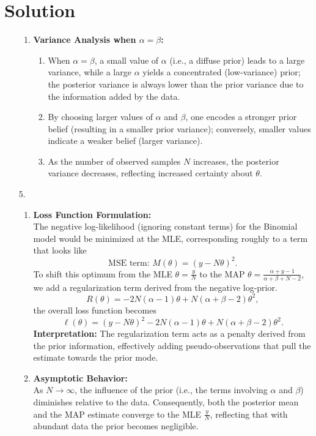 \documentclass[submit]{../harvardml}
\newenvironment{answer}
  {\section*{Solution}}
{}
\begin{document}
\begin{answer}
\begin{enumerate}
\begin{enumerate}
        \item \textbf{Variance Analysis when \(\alpha = \beta\):}\\[1mm]
              \begin{enumerate}
                \item When \(\alpha = \beta\), a small value of \(\alpha\) (i.e., a diffuse prior) leads to a large variance, while a large \(\alpha\) yields a concentrated (low-variance) prior; the posterior variance is always lower than the prior variance due to the information added by the data.
                \item By choosing larger values of \(\alpha\) and \(\beta\), one encodes a stronger prior belief (resulting in a smaller prior variance); conversely, smaller values indicate a weaker belief (larger variance).
                \item As the number of observed samples \(N\) increases, the posterior variance decreases, reflecting increased certainty about \(\theta\).
              \end{enumerate}
      \end{enumerate}

    \item[5.]
      \begin{enumerate}
        \item \textbf{Loss Function Formulation:}\\[1mm]
              The negative log-likelihood (ignoring constant terms) for the Binomial model would be minimized at the MLE, corresponding roughly to a term that looks like
              \[
              \text{MSE term: } M(\theta) = (y-N\theta)^2.
              \]
              To shift this optimum from the MLE \(\theta=\frac{y}{N}\) to the MAP \(\theta=\frac{\alpha+y-1}{\alpha+\beta+N-2}\), we add a regularization term derived from the negative log-prior.
              \[
              R(\theta) = -2N(\alpha-1)\theta + N(\alpha+\beta-2)\theta^2,
              \]
              the overall loss function becomes
              \[
              \ell(\theta) = (y-N\theta)^2 -2N(\alpha-1)\theta + N(\alpha+\beta-2)\theta^2.
              \]
              \textbf{Interpretation:} The regularization term acts as a penalty derived from the prior information, effectively adding pseudo-observations that pull the estimate towards the prior mode.
              
        \item \textbf{Asymptotic Behavior:}\\[1mm]
              As \(N \to \infty\), the influence of the prior (i.e., the terms involving \(\alpha\) and \(\beta\)) diminishes relative to the data. Consequently, both the posterior mean and the MAP estimate converge to the MLE \(\frac{y}{N}\), reflecting that with abundant data the prior becomes negligible.
      \end{enumerate}

  \end{enumerate}
\end{answer}
\end{document}
